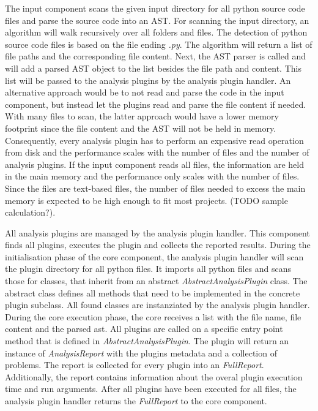 The input component scans the given input directory for all python source code files and parse the source code into an AST. 
For scanning the input directory, an algorithm will walk recursively over all folders and files. The detection of python source code files is based on the file ending \textit{.py}. The algorithm will return a list of file paths and the corresponding file content. 
Next, the AST parser is called and will add a parsed AST object to the list besides the file path and content. This list will be passed to the analysis plugins by the analysis plugin handler.  An alternative approach would be to not read and parse the code in the input component, but instead let the plugins read and parse the file content if needed. With many files to scan, the latter approach would have a lower memory footprint since the file content and the AST will not be held in memory. Consequently, every analysis plugin has to perform an expensive read operation from disk and the performance scales with the number of files and the number of analysis plugins. 
If the input component reads all files, the information are held in the main memory and the performance only scales with the number of files. Since the files are text-based files, the number of files needed to excess the main memory is expected to be high enough to fit most projects. (TODO sample calculation?).

All analysis plugins are managed by the analysis plugin handler. This component finds all plugins, executes the plugin and collects the reported results.
During the initialisation phase of the core component, the analysis plugin handler will scan the plugin directory for all python files. It imports all python files and scans those for classes, that inherit from an abstract \textit{AbstractAnalysisPlugin} class. The abstract class defines all methods that need to be implemented in the concrete plugin subclass. All found classes are instanziated by the analysis plugin handler.
During the core execution phase, the core receives a list with the file name, file content and the parsed ast. All plugins are called on a specific entry point method that is defined in \textit{AbstractAnalysisPlugin}. The plugin will return an instance of \textit{AnalysisReport} with the plugins metadata and a collection of problems. The report is collected for every plugin into an \textit{FullReport}. Additionally, the report contains information about the overal plugin execution time and run arguments. After all plugins have been executed for all files, the analysis plugin handler returns the \textit{FullReport} to the core component.

